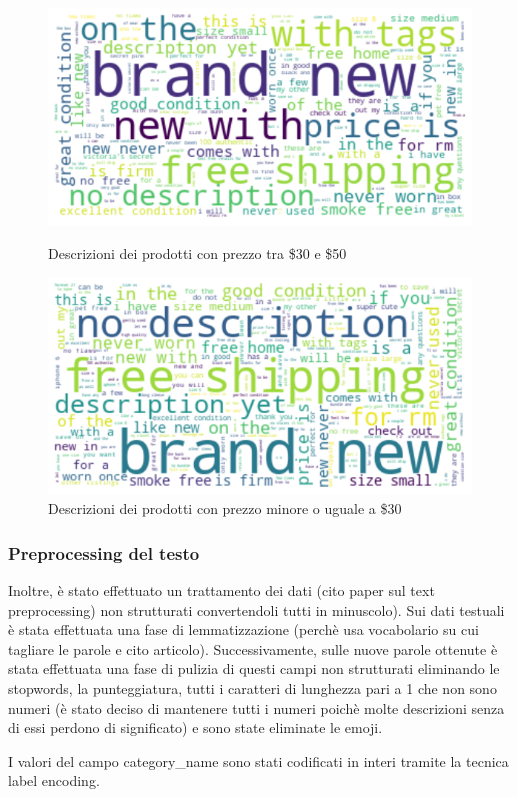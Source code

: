 \begin{figure}[H]
   \begin{minipage}{0.48\textwidth}
     \centering
     \includegraphics[width=.9\linewidth]{30_50}
	\caption{Descrizioni dei prodotti con prezzo tra \$30 e \$50}
	\label{fig:30_50}   
	\end{minipage}\hfill
   \begin{minipage}{0.48\textwidth}
     \centering
     \includegraphics[width=.9\linewidth]{minore_30}
     \caption{Descrizioni dei prodotti con prezzo minore o uguale a \$30}
     \label{Fig:minore_30}
   \end{minipage}
\end{figure}
\subsubsection{Preprocessing del testo}
Inoltre, è stato effettuato un trattamento dei dati (cito paper sul text preprocessing) non strutturati convertendoli tutti in minuscolo).
Sui dati testuali è stata effettuata una fase di lemmatizzazione (perchè usa vocabolario su cui tagliare le parole e cito articolo). Successivamente, sulle nuove parole ottenute è stata effettuata una fase di pulizia di questi campi non strutturati eliminando le stopwords, la punteggiatura, tutti i caratteri di lunghezza pari a 1 che non sono numeri (è stato deciso di mantenere tutti i numeri poichè molte descrizioni senza di essi perdono di significato) e sono state eliminate le emoji.


I valori del campo category\_name sono stati codificati in interi tramite la tecnica label encoding.

